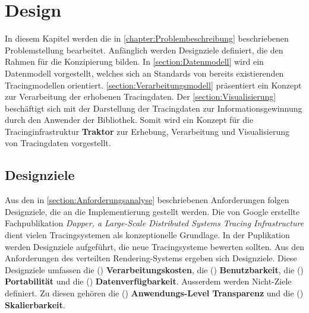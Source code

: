 %

\chapter{Design}
\label{chapter:Design}
In diesem Kapitel werden die in \cref{chapter:Problembeschreibung} beschriebenen Problemstellung bearbeitet. Anfänglich werden Designziele definiert, die den Rahmen für die Konzipierung bilden. In \cref{section:Datenmodell} wird ein Datenmodell vorgestellt, welches sich an Standards von bereits existierenden Tracingmodellen orientiert. \cref{section:Verarbeitungsmodell} präsentiert ein Konzept zur Verarbeitung der erhobenen Tracingdaten. Der \cref{section:Visualisierung} beschäftigt sich mit der Darstellung der Tracingdaten zur Informationsgewinnung durch den Anwender der Bibliothek. Somit wird ein Konzept für die Tracinginfrastruktur \textbf{Traktor }zur Erhebung, Verarbeitung und Visualisierung von Tracingdaten vorgestellt.

\section{Designziele}
\label{section:Designziele}

Aus den in \cref{section:Anforderungsanalyse} beschriebenen Anforderungen folgen Designziele, die an die Implementierung gestellt werden. Die von Google erstellte Fachpublikation \emph{Dapper, a Large-Scale Distributed Systems Tracing Infrastructure} dient vielen Tracingsystemen als konzeptionelle Grundlage. In der Puplikation werden Designziele aufgeführt, die neue Tracingsysteme bewerten sollten. Aus den Anforderungen des verteilten Rendering-Systems ergeben sich Designziele. Diese Designziele umfassen die () \textbf{Verarbeitungskosten}, die () \textbf{Benutzbarkeit}, die () \textbf{Portabilität} und die () \textbf{Datenverfügbarkeit}. Ausserdem werden Nicht-Ziele definiert. Zu diesen gehören die () \textbf{Anwendungs-Level Transparenz} und die () \textbf{Skalierbarkeit}.

